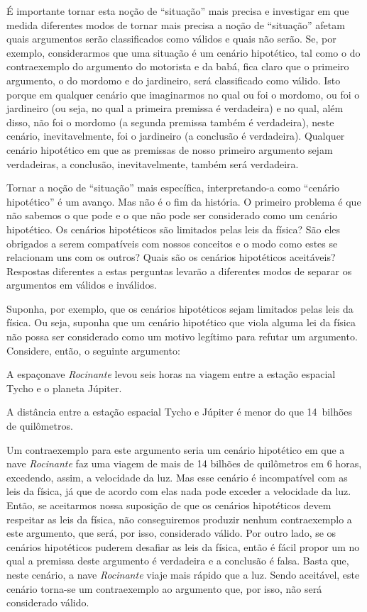 É importante tornar esta noção de ``situação'' mais precisa e investigar em que medida diferentes modos de tornar mais precisa a noção de ``situação'' afetam quais argumentos serão classificados como válidos e quais não serão. 
Se, por exemplo, considerarmos que uma situação é um cenário hipotético, tal como o do contraexemplo do argumento do motorista e da babá, fica claro que o primeiro argumento, o do mordomo e do jardineiro, será classificado como válido.
Isto porque em qualquer cenário que imaginarmos no qual ou foi o mordomo, ou foi o jardineiro (ou seja, no qual a primeira premissa é verdadeira) e no qual, além disso, não foi o mordomo (a segunda premissa também é verdadeira), neste cenário, inevitavelmente, foi o jardineiro (a conclusão é verdadeira).
Qualquer cenário hipotético em que as premissas de nosso primeiro argumento sejam verdadeiras, a conclusão, inevitavelmente, também será verdadeira.

Tornar a noção de ``situação'' mais específica, interpretando-a como ``cenário hipotético'' é um avanço.
Mas não é o fim da história.
O primeiro problema é que não sabemos o que pode e o que não pode ser considerado como um cenário hipotético.
Os cenários hipotéticos são limitados pelas leis da física?
São eles obrigados a serem compatíveis com nossos conceitos e o modo como estes se relacionam uns com os outros?
Quais são os cenários hipotéticos aceitáveis?
Respostas diferentes a estas perguntas levarão a diferentes modos de separar os argumentos em válidos e inválidos.

Suponha, por exemplo, que os cenários hipotéticos sejam limitados pelas leis da física.
Ou seja, suponha que um cenário hipotético que viola alguma lei da física não possa ser considerado como um motivo legítimo para refutar um argumento.
Considere, então, o seguinte argumento:
	\begin{earg}
		\item[] A espaçonave \emph{Rocinante} levou seis horas na viagem entre a estação espacial Tycho e o planeta Júpiter.
		\item[\therefore] A distância entre a estação espacial Tycho e Júpiter é menor do que 14~bilhões de quilômetros.
	\end{earg}
Um contraexemplo para este argumento seria um cenário hipotético em que a nave \emph{Rocinante} faz uma viagem de mais de 14 bilhões de quilômetros em 6 horas, excedendo, assim, a velocidade da luz.
Mas esse cenário é incompatível com as leis da física, já que de acordo com elas nada pode exceder a velocidade da luz.
Então, se aceitarmos nossa suposição de que os cenários hipotéticos devem respeitar as leis da física, não conseguiremos produzir nenhum contraexemplo a este argumento, que será, por isso, considerado válido.
Por outro lado, se os cenários hipotéticos puderem desafiar as leis da física, então é fácil propor um no qual a premissa deste argumento é verdadeira e a conclusão é falsa.
Basta que, neste cenário, a nave \emph{Rocinante} viaje mais rápido que a luz.
Sendo aceitável, este cenário torna-se um contraexemplo ao argumento que, por isso, não será considerado válido.	

